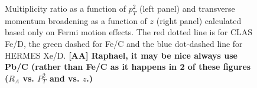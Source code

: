 \begin{figure}[tbp]
\centering
{}
\caption {Multiplicity ratio as a function of $p_T^2$ (left panel) and transverse momentum broadening as a function of $z$ (right panel) calculated based only on Fermi motion effects. 
The red dotted line is for CLAS Fe/D, the green dashed 
for Fe/C and the blue dot-dashed line for HERMES Xe/D.
{\bf [AA] Raphael, it may be nice always use Pb/C (rather than Fe/C as it happens in 2 of these figures ($R_A$ vs. $P_T^2$ and vs. $z$.)}
}
\label{fig:FM-Rpt-DPtz}
\end{figure}


